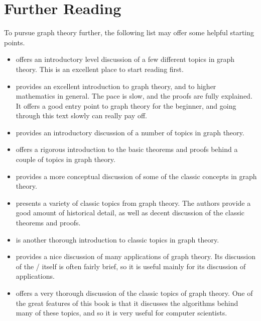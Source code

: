 \documentclass[../../../main.tex]{subfiles}
\begin{document}
\chapter{Further Reading}

To pursue graph theory further, the following list may offer some helpful starting points. 

\begin{itemize}

  \item \citet[ch. 5]{BurgerAndStarbird2010} offers an introductory level discussion of a few different topics in graph theory. This is an excellent place to start reading first.

  \item \citet{Trudeau1993} provides an excellent introduction to graph theory, and to higher mathematics in general. The pace is slow, and the proofs are fully explained. It offers a good entry point to graph theory for the beginner, and going through this text slowly can really pay off.
  
  \item \citet{Chartrand1977} provides an introductory discussion of a number of topics in graph theory.
  
  \item \citet[ch. 8]{Jongsma2019} offers a rigorous introduction to the basic theorems and proofs behind a couple of topics in graph theory.
  
  \item \citet[chs. 6--8]{Flegg1974} provides a more conceptual discussion of some of the classic concepts in graph theory.
  
  \item \citet{BenjaminEtAl2015} presents a variety of classic topics from graph theory. The authors provide a good amount of historical detail, as well as decent discussion of the classic theorems and proofs.

  \item \citet{HartsfieldAndRingel1990} is another thorough introduction to classic topics in graph theory.

  \item \citet{Fournier2009} provides a nice discussion of many applications of graph theory. Its discussion of the \math/ itself is often fairly brief, so it is useful mainly for its discussion of applications. 

  \item \citet{Gould2012} offers a very thorough discussion of the classic topics of graph theory. One of the great features of this book is that it discusses the algorithms behind many of these topics, and so it is very useful for computer scientists.

\end{itemize}
\end{document}
